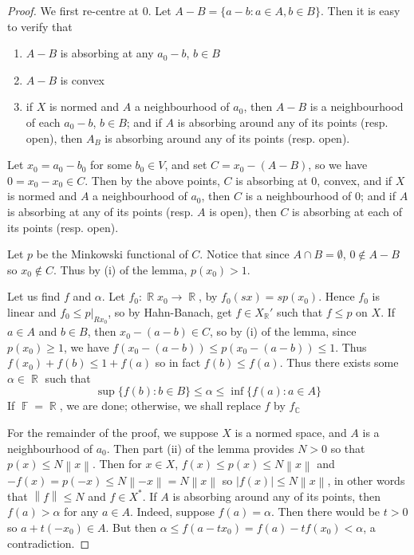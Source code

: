 \documentclass[11pt, a4paper]{memoir}
\DeclareMathOperator{\R}{{\mathbb{R}}}
\DeclareMathOperator{\C}{{\mathbb{C}}}
\DeclareMathOperator{\F}{{\mathbb{F}}}
\newcommand{\norm}[1]{\ensuremath{\left\lVert#1\right\rVert}}
\theoremstyle{change}
\theoremstyle{plain}
\theoremstyle{nonumberplain}
\newtheorem{proof}{Proof}
\numberwithin{equation}{section}
\begin{document}
\begin{proof}
    We first re-centre at $0$.
    Let $A-B=\{a-b:a\in A,b\in B\}$.
    Then it is easy to verify that
    \begin{enumerate}[nl,r]
        \item $A-B$ is absorbing at any $a_0-b$, $b\in B$
        \item $A-B$ is convex
        \item if $X$ is normed and $A$ a neighbourhood of $a_0$, then $A-B$ is a neighbourhood of each $a_0-b$, $b\in B$; and if $A$ is absorbing around any of its points (resp. open), then $A_B$ is absorbing around any of its points (resp. open).
    \end{enumerate}
    Let $x_0=a_0-b_0$ for some $b_0\in V$, and set $C=x_0-(A-B)$, so we have $0=x_0-x_0\in C$.
    Then by the above points, $C$ is absorbing at 0, convex, and if $X$ is normed and $A$ a neighbourhood of $a_0$, then $C$ is a neighbourhood of $0$; and if $A$ is absorbing at any of its points (resp. $A$ is open), then $C$ is absorbing at each of its points (resp. open).

    Let $p$ be the Minkowski functional of $C$.
    Notice that since $A\cap B=\emptyset$, $0\notin A-B$ so $x_0\notin C$.
    Thus by (i) of the lemma, $p(x_0)>1$.

    Let us find $f$ and $\alpha$.
    Let $f_0:\R x_0\to\R$, by $f_0(sx)=sp(x_0)$.
    Hence $f_0$ is linear and $f_0\leq p|_{Rx_0}$, so by Hahn-Banach, get $f\in X_{\R}'$ such that $f\leq p$ on $X$.
    If $a\in A$ and $b\in B$, then $x_0-(a-b)\in C$, so by (i) of the lemma, since $p(x_0)\geq 1$, we have $f(x_0-(a-b))\leq p(x_0-(a-b))\leq 1$.
    Thus $f(x_0)+f(b)\leq 1+f(a)$ so in fact $f(b)\leq f(a)$.
    Thus there exists some $\alpha\in\R$ such that
    \begin{equation*}
        \sup\{f(b):b\in B\}\leq\alpha\leq\inf\{f(a):a\in A\}
    \end{equation*}
    If $\F=\R$, we are done; otherwise, we shall replace $f$ by $f_{\C}$

    For the remainder of the proof, we suppose $X$ is a normed space, and $A$ is a neighbourhood of $a_0$.
    Then part (ii) of the lemma provides $N>0$ so that $p(x)\leq N\norm{x}$.
    Then for $x\in X$, $f(x)\leq p(x)\leq N\norm{x}$ and $-f(x)=p(-x)\leq N\norm{-x}=N\norm{x}$ so $|f(x)|\leq N\norm{x}$, in other words that $\norm{f}\leq N$ and $f\in X^*$.
    If $A$ is absorbing around any of its points, then $f(a)>\alpha$ for any $a\in A$.
    Indeed, suppose $f(a)=\alpha$.
    Then there would be $t>0$ so $a+t(-x_0)\in A$.
    But then $\alpha\leq f(a-tx_0)=f(a)-tf(x_0)<\alpha$, a contradiction.
\end{proof}
\end{document}
